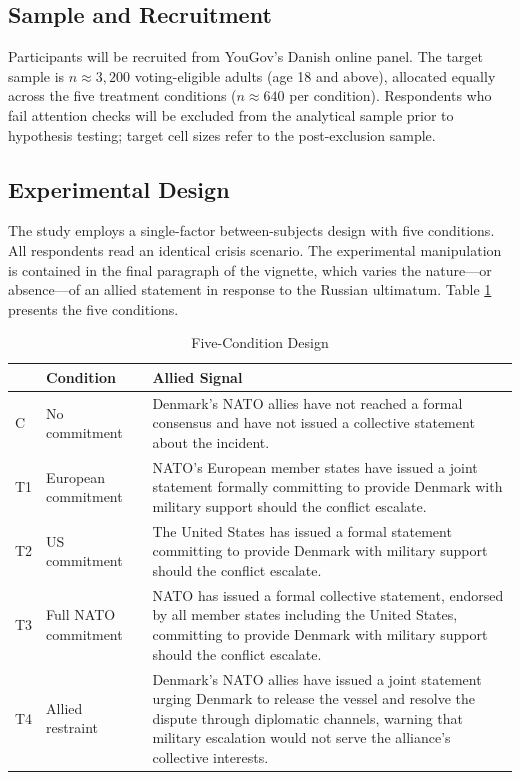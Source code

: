 \subsection{Sample and Recruitment}

Participants will be recruited from YouGov's Danish online panel. The target sample is $n \approx 3{,}200$ voting-eligible adults (age 18 and above), allocated equally across the five treatment conditions ($n \approx 640$ per condition). Respondents who fail attention checks will be excluded from the analytical sample prior to hypothesis testing; target cell sizes refer to the post-exclusion sample.

\subsection{Experimental Design}

The study employs a single-factor between-subjects design with five conditions. All respondents read an identical crisis scenario. The experimental manipulation is contained in the final paragraph of the vignette, which varies the nature---or absence---of an allied statement in response to the Russian ultimatum. Table \ref{tab:design} presents the five conditions.

\begin{table}[H]
\centering
\caption{Five-Condition Design}
\label{tab:design}
\footnotesize
\begin{tabular}{p{0.4cm} p{3.2cm} p{8.8cm}}
\toprule
 & \textbf{Condition} & \textbf{Allied Signal} \\
\midrule
C  & No commitment       & Denmark's NATO allies have not reached a formal consensus and have not issued a collective statement about the incident. \\[5pt]
T1 & European commitment & NATO's European member states have issued a joint statement formally committing to provide Denmark with military support should the conflict escalate. \\[5pt]
T2 & US commitment       & The United States has issued a formal statement committing to provide Denmark with military support should the conflict escalate. \\[5pt]
T3 & Full NATO commitment & NATO has issued a formal collective statement, endorsed by all member states including the United States, committing to provide Denmark with military support should the conflict escalate. \\[5pt]
T4 & Allied restraint    & Denmark's NATO allies have issued a joint statement urging Denmark to release the vessel and resolve the dispute through diplomatic channels, warning that military escalation would not serve the alliance's collective interests. \\
\bottomrule
\end{tabular}
\end{table}

